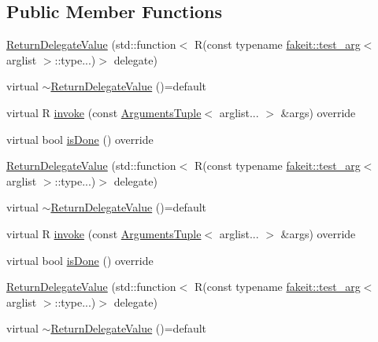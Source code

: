 \subsection*{Public Member Functions}
\begin{DoxyCompactItemize}
\item 
\mbox{\hyperlink{structfakeit_1_1ReturnDelegateValue_a889666c123cb4e75bee7771b9d9433a5}{Return\+Delegate\+Value}} (std\+::function$<$ R(const typename \mbox{\hyperlink{structfakeit_1_1test__arg}{fakeit\+::test\+\_\+arg}}$<$ arglist $>$\+::type...)$>$ delegate)
\item 
virtual \mbox{\hyperlink{structfakeit_1_1ReturnDelegateValue_aa99d3b17fdae68f84cbc38c0acaee3c7}{$\sim$\+Return\+Delegate\+Value}} ()=default
\item 
virtual R \mbox{\hyperlink{structfakeit_1_1ReturnDelegateValue_a6f3758c13895d1fc748357f94983404a}{invoke}} (const \mbox{\hyperlink{namespacefakeit_a476a37a598825e1b5dd67b3a176491a1}{Arguments\+Tuple}}$<$ arglist... $>$ \&args) override
\item 
virtual bool \mbox{\hyperlink{structfakeit_1_1ReturnDelegateValue_ac6c33b7d5fff3fedeec91a4780924b84}{is\+Done}} () override
\item 
\mbox{\hyperlink{structfakeit_1_1ReturnDelegateValue_a889666c123cb4e75bee7771b9d9433a5}{Return\+Delegate\+Value}} (std\+::function$<$ R(const typename \mbox{\hyperlink{structfakeit_1_1test__arg}{fakeit\+::test\+\_\+arg}}$<$ arglist $>$\+::type...)$>$ delegate)
\item 
virtual \mbox{\hyperlink{structfakeit_1_1ReturnDelegateValue_aa99d3b17fdae68f84cbc38c0acaee3c7}{$\sim$\+Return\+Delegate\+Value}} ()=default
\item 
virtual R \mbox{\hyperlink{structfakeit_1_1ReturnDelegateValue_a6f3758c13895d1fc748357f94983404a}{invoke}} (const \mbox{\hyperlink{namespacefakeit_a476a37a598825e1b5dd67b3a176491a1}{Arguments\+Tuple}}$<$ arglist... $>$ \&args) override
\item 
virtual bool \mbox{\hyperlink{structfakeit_1_1ReturnDelegateValue_ac6c33b7d5fff3fedeec91a4780924b84}{is\+Done}} () override
\item 
\mbox{\hyperlink{structfakeit_1_1ReturnDelegateValue_a889666c123cb4e75bee7771b9d9433a5}{Return\+Delegate\+Value}} (std\+::function$<$ R(const typename \mbox{\hyperlink{structfakeit_1_1test__arg}{fakeit\+::test\+\_\+arg}}$<$ arglist $>$\+::type...)$>$ delegate)
\item 
virtual \mbox{\hyperlink{structfakeit_1_1ReturnDelegateValue_aa99d3b17fdae68f84cbc38c0acaee3c7}{$\sim$\+Return\+Delegate\+Value}} ()=default

\end{DoxyCompactItemize}
